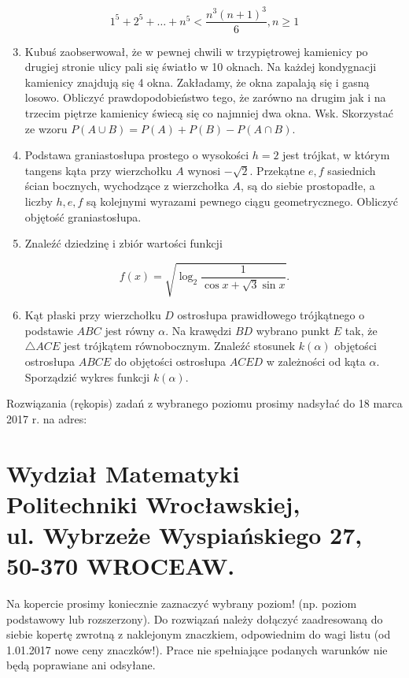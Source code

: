 \documentclass[10pt]{article}
\begin{document}
$$
1^{5}+2^{5}+\ldots+n^{5}<\frac{n^{3}(n+1)^{3}}{6}, n \geq 1
$$

\begin{enumerate}
  \setcounter{enumi}{2}
  \item Kubuś zaobserwował, że w pewnej chwili w trzypiętrowej kamienicy po drugiej stronie ulicy pali się światło w 10 oknach. Na każdej kondygnacji kamienicy znajdują się 4 okna. Zakładamy, że okna zapalają się i gasną losowo. Obliczyć prawdopodobieństwo tego, że zarówno na drugim jak i na trzecim piętrze kamienicy świecą się co najmniej dwa okna. Wsk. Skorzystać ze wzoru $P(A \cup B)=P(A)+P(B)-P(A \cap B)$.
  \item Podstawa graniastosłupa prostego o wysokości $h=2$ jest trójkat, w którym tangens kąta przy wierzchołku $A$ wynosi $-\sqrt{2}$. Przekạtne $e, f$ sasiednich ścian bocznych, wychodzące z wierzchołka $A$, są do siebie prostopadłe, a liczby $h, e, f$ są kolejnymi wyrazami pewnego ciągu geometrycznego. Obliczyć objętość graniastosłupa.
  \item Znaleźć dziedzinę i zbiór wartości funkcji
\end{enumerate}

$$
f(x)=\sqrt{\log _{2} \frac{1}{\cos x+\sqrt{3} \sin x}} .
$$

\begin{enumerate}
  \setcounter{enumi}{5}
  \item Kąt płaski przy wierzchołku $D$ ostrosłupa prawidłowego trójkątnego o podstawie $A B C$ jest równy $\alpha$. Na krawędzi $B D$ wybrano punkt $E$ tak, że $\triangle A C E$ jest trójkątem równobocznym. Znaleźć stosunek $k(\alpha)$ objętości ostrosłupa $A B C E$ do objętości ostrosłupa $A C E D$ w zależności od kąta $\alpha$. Sporządzić wykres funkcji $k(\alpha)$.
\end{enumerate}

Rozwiązania (rękopis) zadań z wybranego poziomu prosimy nadsyłać do 18 marca 2017 r. na adres:

\section*{Wydział Matematyki \\
 Politechniki Wrocławskiej, \\
 ul. Wybrzeże Wyspiańskiego 27, \\
 50-370 WROCEAW.}
Na kopercie prosimy koniecznie zaznaczyć wybrany poziom! (np. poziom podstawowy lub rozszerzony). Do rozwiązań należy dołączyć zaadresowaną do siebie kopertę zwrotną z naklejonym znaczkiem, odpowiednim do wagi listu (od 1.01.2017 nowe ceny znaczków!). Prace nie spełniające podanych warunków nie będą poprawiane ani odsyłane.
\end{document}

